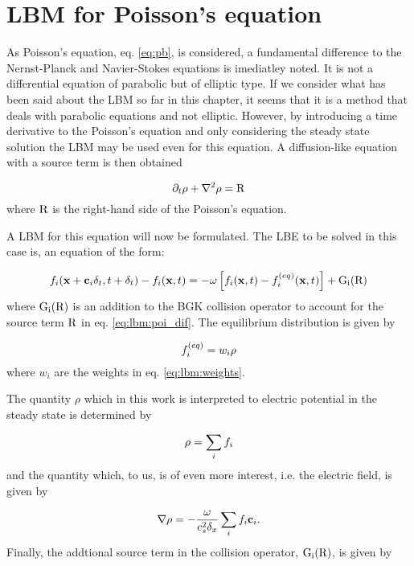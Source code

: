 \section{LBM for Poisson's equation}
As Poisson's equation, eq. \eqref{eq:pb}, is considered, a fundamental
difference to the Nernst-Planck and Navier-Stokes equations is
imediatley noted. It is not a differential equation of parabolic but
of elliptic type. If we consider what has been said about the LBM so
far in this chapter, it seems that it is a method that deals with
parabolic equations and not elliptic. However, by introducing a time
derivative to the Poisson's equation and only considering the steady state
solution the LBM may be used even for this equation. A diffusion-like
equation with a source term is then obtained

\begin{equation}\label{eq:lbm:poi_dif}
\partial_t\rho + \nabla^2 \rho = \mathrm{R}
\end{equation}
where $\mathrm{R}$ is the right-hand side of the Poisson's equation.

A LBM for this equation will now be formulated. The LBE to be solved
in this case is, an equation of the form:

\begin{equation}
f_i(\mathbf{x} + \mathbf{c}_i\delta_t, t + \delta_t) - f_i(\mathbf{x}, t) = -\omega \left[
  f_i(\mathbf{x}, t) - f_i^{(eq)}(\mathbf{x}, t) \right] + \mathrm{G_i}(\mathrm{R})
\end{equation}
where $\mathrm{G_i}(\mathrm{R})$ is an addition to the BGK collision operator to account
for the source term $\mathrm{R}$ in eq. \eqref{eq:lbm:poi_dif}. The equilibrium
distribution is given by

\begin{equation}
f_i^{(eq)} = w_i \rho
\end{equation}
where $w_i$ are the weights in eq. \eqref{eq:lbm:weights}.

The quantity $\rho$ which in this work is interpreted to electric
potential in the steady state is determined by

\begin{equation}
\rho = \sum_i f_i
\end{equation}
and the quantity which, to us, is of even more interest, i.e. the
electric field, is given by

\begin{equation}
\nabla \rho = - \frac{\omega}{c_s^2 \delta_x} \sum_i f_i \mathbf{c}_i.
\end{equation}
Finally, the addtional source term in the collision operator, $\mathrm{G_i}(\mathrm{R})$,
is given by

